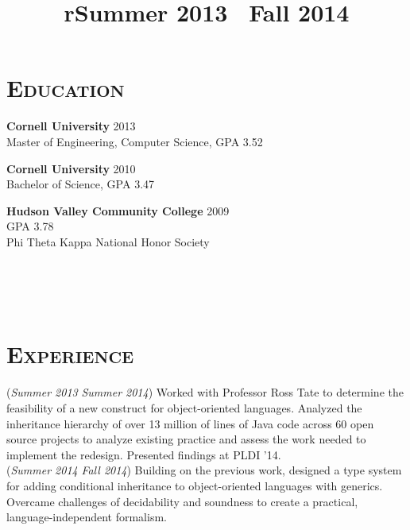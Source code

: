 \begin{resume}


\section{\textsc{Education}}

\textbf{Cornell University} \hfill 2013  \\
Master of Engineering, Computer Science, GPA 3.52

\textbf{Cornell University} \hfill 2010 \\
Bachelor of Science, GPA 3.47%

\textbf{Hudson Valley Community College} \hfill 2009  \\ 
GPA 3.78\\
Phi Theta Kappa National Honor Society


\begin{formatb}
  \title{r}\\
  \\
  \body\\
\end{formatb}

\vfill

\section{\textsc{Experience}}

\title{Summer 2013 \textendash \ Fall 2014}
\location{}
\begin{position}
(\emph{Summer 2013} \textendash \emph{Summer 2014})  Worked with Professor Ross Tate to determine the feasibility of a new construct for object-oriented languages.
Analyzed the inheritance hierarchy of over 13 million of lines of Java code across 60 open source projects to analyze existing practice and assess the work needed to implement the redesign.
Presented findings at PLDI '14.
\\
(\emph{Summer 2014} \textendash \emph{Fall 2014})  Building on the previous work, designed a type system for adding conditional inheritance to object-oriented languages with generics.
Overcame challenges of decidability and soundness to create a practical, language-independent formalism.
\end{position}


\end{resume}
